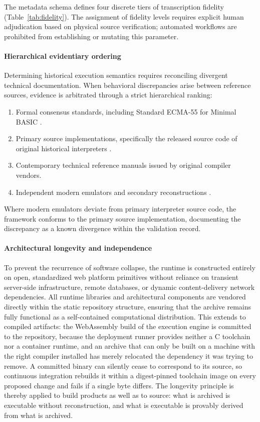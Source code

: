\documentclass[3p,times,authoryear,twocolumn]{elsarticle}
\begin{document}
The metadata schema defines four discrete tiers of transcription fidelity (Table~\ref{tab:fidelity}). The assignment of fidelity levels requires explicit human adjudication based on physical source verification; automated workflows are prohibited from establishing or mutating this parameter.

\paragraph{Hierarchical evidentiary ordering} Determining historical execution semantics requires reconciling divergent technical documentation. When behavioral discrepancies arise between reference sources, evidence is arbitrated through a strict hierarchical ranking:
\begin{enumerate}
\item Formal consensus standards, including Standard ECMA-55 for Minimal BASIC \citep{ecma55}.
\item Primary source implementations, specifically the released source code of original historical interpreters \citep{gwbasic}.
\item Contemporary technical reference manuals issued by original compiler vendors.
\item Independent modern emulators and secondary reconstructions \citep{pcbasic}.
\end{enumerate}
Where modern emulators deviate from primary interpreter source code, the framework conforms to the primary source implementation, documenting the discrepancy as a known divergence within the validation record.

\paragraph{Architectural longevity and independence} To prevent the recurrence of software collapse, the runtime is constructed entirely on open, standardized web platform primitives without reliance on transient server-side infrastructure, remote databases, or dynamic content-delivery network dependencies. All runtime libraries and architectural components are vendored directly within the static repository structure, ensuring that the archive remains fully functional as a self-contained computational distribution. This extends to compiled artifacts: the WebAssembly build of the execution engine is committed to the repository, because the deployment runner provides neither a C toolchain nor a container runtime, and an archive that can only be built on a machine with the right compiler installed has merely relocated the dependency it was trying to remove. A committed binary can silently cease to correspond to its source, so continuous integration rebuilds it within a digest-pinned toolchain image on every proposed change and fails if a single byte differs. The longevity principle is thereby applied to build products as well as to source: what is archived is executable without reconstruction, and what is executable is provably derived from what is archived.
\end{document}
